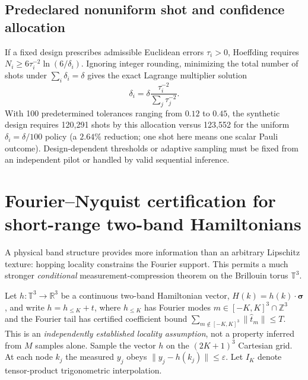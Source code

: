 \documentclass[aps,prd,onecolumn,notitlepage,11pt,superscriptaddress,longbibliography]{revtex4-2}
\begin{document}
\subsection{Predeclared nonuniform shot and confidence allocation}
If a fixed design prescribes admissible Euclidean errors
$\tau_i>0$, Hoeffding requires
$N_i\ge 6\tau_i^{-2}\ln(6/\delta_i)$.
Ignoring integer rounding, minimizing the total number of shots
under $\sum_i\delta_i=\delta$ gives the exact Lagrange
multiplier solution
\begin{equation}\label{eq:opt-delta}
\boxed{\delta_i=\delta\frac{\tau_i^{-2}}{\sum_j\tau_j^{-2}}.}
\end{equation}
With 100 predetermined tolerances ranging from $0.12$ to $0.45$,
the synthetic design requires 120,291 shots by this allocation versus
123,552 for the uniform $\delta_i=\delta/100$ policy
(a $2.64\%$ reduction; one shot here means one scalar Pauli outcome).
Design-dependent thresholds or adaptive sampling must be fixed
from an independent pilot or handled by valid sequential inference.

\section{Fourier--Nyquist certification for short-range two-band Hamiltonians}
A physical band structure provides more information than an
arbitrary Lipschitz texture: hopping locality constrains the
Fourier support. This permits a much stronger \emph{conditional}
measurement-compression theorem on the Brillouin torus $\mathbb T^3$.

Let $h:\mathbb T^3\to\mathbb R^3$ be a continuous two-band
Hamiltonian vector, $H(k)=h(k)\cdot\bm\sigma$, and write
$h=h_{\le K}+t$, where $h_{\le K}$ has Fourier modes
$m\in[-K,K]^3\cap\mathbb Z^3$ and the Fourier tail has certified
coefficient bound
$\sum_{m\notin[-K,K]^3}\|\widehat t_m\|\le T$.
This is an \emph{independently established locality assumption},
not a property inferred from $M$ samples alone.
Sample the vector $h$ on the $(2K+1)^3$ Cartesian grid.
At each node $k_j$ the measured $y_j$ obeys
$\|y_j-h(k_j)\|\le\varepsilon$.
Let $I_K$ denote tensor-product trigonometric interpolation.
\end{document}
